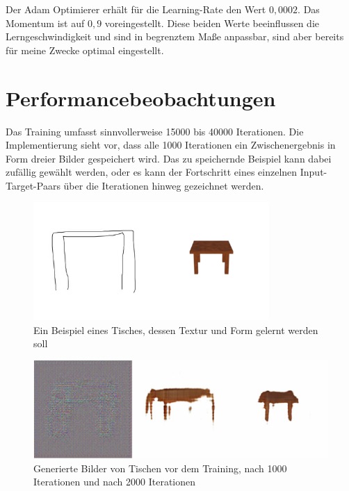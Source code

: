 Der Adam Optimierer \cite{kingma2017adam} erhält für die Learning-Rate den Wert $0,0002$. Das Momentum ist auf $0,9$ voreingestellt. Diese beiden Werte beeinflussen die Lerngeschwindigkeit und sind in begrenztem Maße anpassbar, sind aber bereits für meine Zwecke optimal eingestellt.

\section{Performancebeobachtungen}
\label{sec:performance}
Das Training umfasst sinnvollerweise 15000 bis 40000 Iterationen. Die Implementierung sieht vor, dass alle 1000 Iterationen ein Zwischenergebnis in Form dreier Bilder gespeichert wird. Das zu speichernde Beispiel kann dabei zufällig gewählt werden, oder es kann der Fortschritt eines einzelnen Input-Target-Paars über die Iterationen hinweg gezeichnet werden.

\begin{figure}[h]
  \centering
	\includegraphics[width=0.8\textwidth]{bilder/pix2pix_progress/394_input.png}
  \caption[Quadratischer Tisch]{Ein Beispiel eines Tisches, dessen Textur und Form gelernt werden soll}
  \label{fig:trainingexample}
\end{figure}

\begin{figure}[h]
	\centering
	\includegraphics[width=1.0\textwidth]{bilder/pix2pix_progress/progress_tables.png}
	\caption[Lernfortschritt am Beispiel von Tischen 1]{Generierte Bilder von Tischen vor dem Training, nach 1000 Iterationen und nach 2000 Iterationen}
	\label{fig:pix2pixprogress1}
\end{figure}

